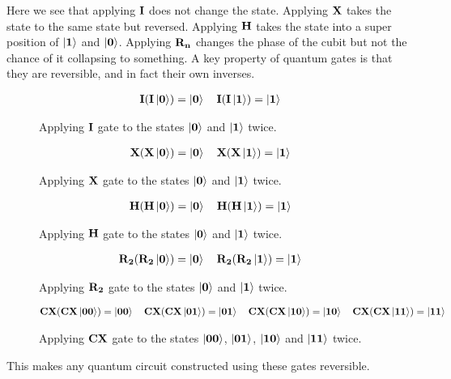 \vspace{\baselineskip}
\noindent
Here we see that applying $\mathbf{I}$ does not change the state. Applying $\mathbf{X}$ takes the state to the same state but reversed. Applying $\mathbf{H}$ takes the state into a super position of $\ket{\mathbf{1}}$ and $\ket{\mathbf{0}}$. Applying $\mathbf{R_{n}}$ changes the phase of the cubit but not the chance of it collapsing to something. 
A key property of quantum gates is that they are reversible, and in fact their own inverses. 
\begin{figure}[H]
    \centering
    \begin{align*}
        \mathbf{I}(\mathbf{I}\ket{\mathbf{0}})=\ket{\mathbf{0}}\quad
        \mathbf{I}(\mathbf{I}\ket{\mathbf{1}})=\ket{\mathbf{1}}
    \end{align*}
    \caption{Applying $\mathbf{I}$ gate to the states $\ket{\mathbf{0}}$ and $\ket{\mathbf{1}}$ twice.}
    \label{fig:i2}
\end{figure}

\begin{figure}[H]
    \centering
    \begin{align*}
        \mathbf{X}(\mathbf{X}\ket{\mathbf{0}})=\ket{\mathbf{0}}\quad
        \mathbf{X}(\mathbf{X}\ket{\mathbf{1}})=\ket{\mathbf{1}}
    \end{align*}
    \caption{Applying $\mathbf{X}$ gate to the states $\ket{\mathbf{0}}$ and $\ket{\mathbf{1}}$ twice.}
    \label{fig:x2}
\end{figure}

\begin{figure}[H]
    \centering
    \begin{align*}
        \mathbf{H}(\mathbf{H}\ket{\mathbf{0}})=\ket{\mathbf{0}}\quad
        \mathbf{H}(\mathbf{H}\ket{\mathbf{1}})=\ket{\mathbf{1}}
    \end{align*}
    \caption{Applying $\mathbf{H}$ gate to the states $\ket{\mathbf{0}}$ and $\ket{\mathbf{1}}$ twice.}
    \label{fig:h2}
\end{figure}

\begin{figure}[H]
    \centering
    \begin{align*}
        \mathbf{R_{2}}(\mathbf{R_{2}}\ket{\mathbf{0}})=\ket{\mathbf{0}}\quad
        \mathbf{R_{2}}(\mathbf{R_{2}}\ket{\mathbf{1}})=\ket{\mathbf{1}}
    \end{align*}
    \caption{Applying $\mathbf{R_{2}}$ gate to the states $\ket{\mathbf{0}}$ and $\ket{\mathbf{1}}$ twice.}
    \label{fig:r22}
\end{figure}

\begin{figure}[H]
    \centering
    \begin{align*}
        \mathbf{CX}(\mathbf{CX}\ket{\mathbf{0}\mathbf{0}})=\ket{\mathbf{0}\mathbf{0}} \quad        
        \mathbf{CX}(\mathbf{CX}\ket{\mathbf{0}\mathbf{1}})=\ket{\mathbf{0}\mathbf{1}} \quad
        \mathbf{CX}(\mathbf{CX}\ket{\mathbf{1}\mathbf{0}})=\ket{\mathbf{1}\mathbf{0}}\quad
        \mathbf{CX}(\mathbf{CX}\ket{\mathbf{1}\mathbf{1}})=\ket{\mathbf{1}\mathbf{1}}
    \end{align*}
    \caption{Applying $\mathbf{CX}$ gate to the states $\ket{\mathbf{0}\mathbf{0}}$, $\ket{\mathbf{0}\mathbf{1}}$, $\ket{\mathbf{1}\mathbf{0}}$ and $\ket{\mathbf{1}\mathbf{1}}$ twice.}
    \label{fig:cx2}
\end{figure}
\noindent
This makes any quantum circuit constructed using these gates reversible.

